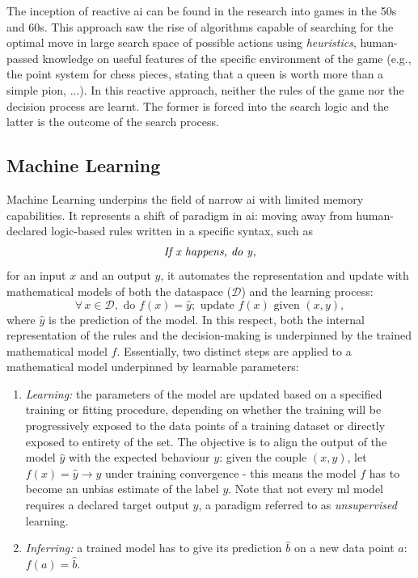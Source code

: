 The inception of reactive \gls{ai} can be found in the research into games in the 50s and 60s. This approach saw the rise of algorithms capable of searching for the optimal move in large search space of possible actions using \textit{heuristics}, human-passed knowledge on useful features of the specific environment of the game (e.g., the point system for chess pieces, stating that a queen is worth more than a simple pion, ...). In this reactive approach, neither the rules of the game nor the decision process are learnt. The former is forced into the search logic and the latter is the outcome of the search process.

\subsection{Machine Learning} 
Machine Learning underpins the field of narrow \gls{ai} with limited memory capabilities. It represents a shift of paradigm in \gls{ai}: moving away from human-declared logic-based rules written in a specific syntax, such as \[\textrm{\textit{If x happens, do y}},\] for an input $x$ and an output $y$, it automates the representation and update with mathematical models of both the dataspace ($\mathcal{D}$) and the learning process: \[\forall\, x \in \mathcal{D}, \textrm{ do }f(x) = \hat{y}; \textrm{ update }f(x) \textrm{ given } (x, y),\] where $\hat{y}$ is the prediction of the model. In this respect, both the internal representation of the rules and the decision-making is underpinned by the trained mathematical model $f$. Essentially, two distinct steps are applied to a mathematical model underpinned by learnable parameters: 
\begin{enumerate}
    \item \textit{Learning:} the parameters of the model are updated based on a specified training or fitting procedure, depending on whether the training will be progressively exposed to the data points of a training dataset or directly exposed to entirety of the set. The objective is to align the output of the model $\hat{y}$ with the expected behaviour $y$: given the couple $(x, y)$, let $f(x) = \hat{y} \rightarrow y$ under training convergence - this means the model $f$ has to become an unbias estimate of the label $y$. Note that not every \gls{ml} model requires a declared target output $y$, a paradigm referred to as \textit{unsupervised} learning.
    \item \textit{Inferring:} a trained model has to give its prediction $\hat{b}$ on a new data  point $a$: $f(a) = \hat{b}$.
\end{enumerate}
